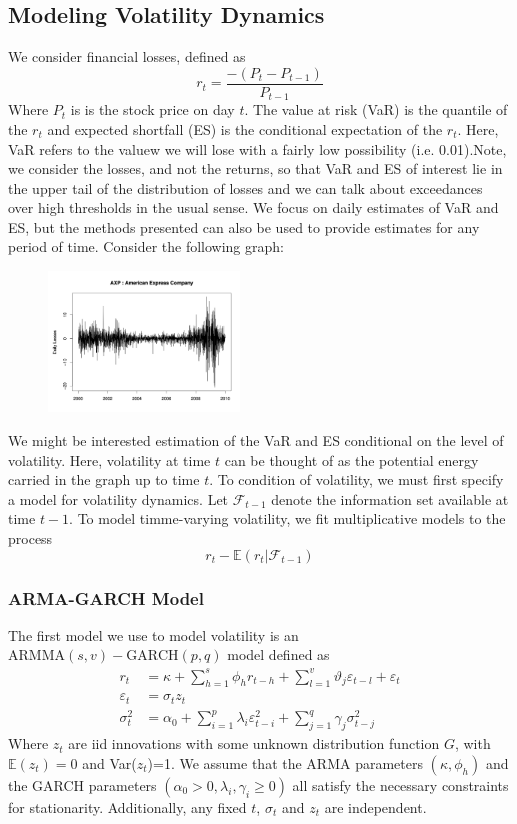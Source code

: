 \documentclass{article}
\theoremstyle{definition}
\theoremstyle{definition}
\def\E{\mathbb{E}}
\def\f{\mathcal{F}}
\begin{document}
\subsection{Modeling Volatility Dynamics}
We consider financial losses, defined as
\[r_t=\frac{-(P_t-P_{t-1})}{P_{t-1}}\]
Where $P_t$ is is the stock price on day $t$. The value at risk (VaR) is the quantile of the $r_t$ and expected shortfall (ES) is the conditional expectation of the $r_t$. Here, VaR refers to the valuew we will lose with a fairly low possibility (i.e. 0.01).Note, we consider the losses, and not the returns, so that VaR and ES of interest lie in the upper tail of the distribution of losses and we can talk about exceedances over high thresholds in the usual sense. We focus on daily estimates of VaR and ES, but the methods presented can also be used to provide estimates for any period of time. Consider the following graph:
\begin{figure}[H]
\begin{center}
{\includegraphics[width=2in]{notes/volatility.png}}
\end{center}
\end{figure}
We might be interested estimation of the VaR and ES conditional on the level of volatility. Here, volatility at time $t$ can be thought of as the potential energy carried in the graph up to time $t$. To condition of volatility, we must first specify a model for volatility dynamics. Let $\f_{t-1}$ denote the information set available at time $t-1$. To model timme-varying volatility, we fit multiplicative models to the process
\[r_t-\E(r_t|\f_{t-1})\]

\subsubsection{ARMA-GARCH Model}
The first model we use to model volatility is an $\text{ARMMA}(s,v)-\text{GARCH}(p,q)$ model defined as 
\begin{align*}
    r_t&= \kappa+ \sum_{h=1}^s\phi_hr_{t-h} + \sum_{l=1}^v \vartheta_j\varepsilon_{t-l}+\varepsilon_t\\
    \varepsilon_t&= \sigma_tz_t\\
    \sigma_t^2&=\alpha_0 + \sum_{i=1}^p\lambda_i\varepsilon_{t-i}^2+\sum_{j=1}^q\gamma_j\sigma_{t-j}^2
\end{align*}
Where $z_t$ are iid innovations with some unknown distribution function $G$, with $\E(z_t)=0$ and Var($z_t$)=1. We assume that the ARMA parameters $(\kappa, \phi_h)$ and the GARCH parameters $(\alpha_0>0, \lambda_i,\gamma_i\geq 0)$ all satisfy the necessary constraints for stationarity. Additionally, any fixed $t$, $\sigma_t$ and $z_t$ are independent.
\end{document}
